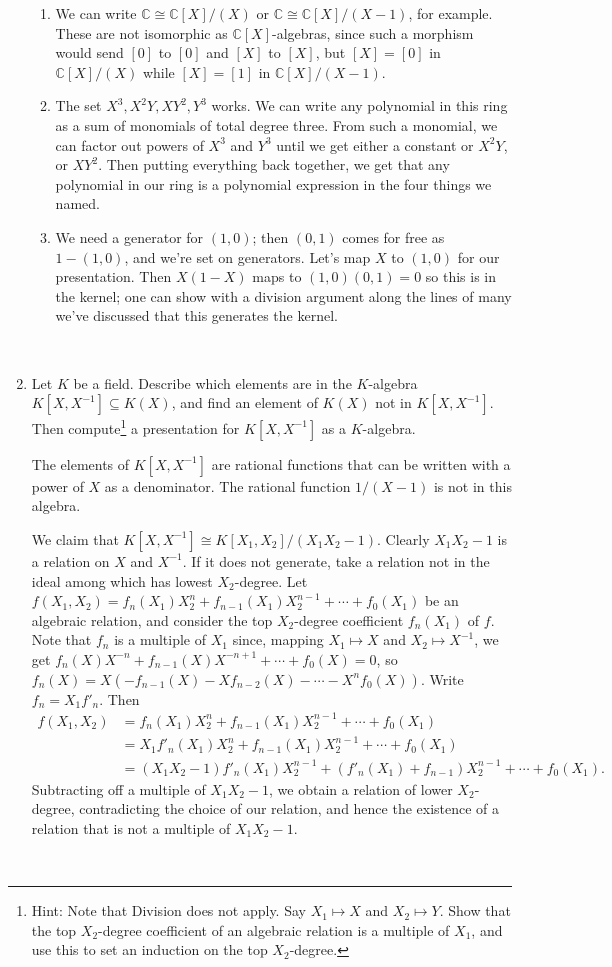 \documentclass[12pt]{amsart}
\newcommand{\C}{\mathbb{C}}
\newcommand{\solution}[1]{\ifthenelse {\equal{\displaysol}{1}} {\begin{framed}{\color{meretale}\noindent #1}\end{framed}} { \ }}
\newcommand\itemB{\stepcounter{enumi}\item[(\theenumi)]}
\newcommand\itemb{\stepcounter{enumii}\item[(\theenumii)]}
\begin{document}
\begin{enumerate}
\solution{
\begin{enumerate}
\itemb We can write $\C\cong \C[X]/(X)$ or $\C \cong \C[X]/(X-1)$, for example. These are not isomorphic as $\C[X]$-algebras, since such a morphism would send $[0]$ to $[0]$ and $[X]$ to $[X]$, but $[X]=[0]$ in $\C[X]/(X)$ while $[X]=[1]$ in $\C[X]/(X-1)$.
\itemb The set $X^3,X^2Y,XY^2,Y^3$ works. We can write any polynomial in this ring as a sum of monomials of total degree three. From such a monomial, we can factor out powers of $X^3$ and $Y^3$ until we get either a constant or $X^2Y$, or $XY^2$. Then putting everything back together, we get that any polynomial in our ring is a polynomial expression in the four things we named.
\itemb We need a generator for $(1,0)$; then $(0,1)$ comes for free as $1-(1,0)$, and we're set on generators. Let's map $X$ to $(1,0)$ for our presentation. Then $X(1-X)$ maps to $(1,0)(0,1)=0$ so this is in the kernel; one can show with a division argument along the lines of many we've discussed that this generates the kernel.
\end{enumerate}
}


\itemB Let $K$ be a field. Describe which elements are in the $K$-algebra $K[X,X^{-1}]\subseteq K(X)$, and find an element of $K(X)$ not in $K[X,X^{-1}]$. Then compute\footnote{Hint: Note that Division does not apply. Say $X_1 \mapsto X$ and $X_2 \mapsto Y$. Show that the top $X_2$-degree coefficient of an algebraic relation is a multiple of $X_1$, and use this to set an induction on the top $X_2$-degree.} a presentation for $K[X,X^{-1}]$ as a $K$-algebra.

\solution{The elements of $K[X,X^{-1}]$ are rational functions that can be written with a power of $X$ as a denominator. The rational function $1/(X-1)$ is not in this algebra.

We claim that $K[X,X^{-1}]\cong K[X_1,X_2]/(X_1 X_2-1)$. Clearly $X_1 X_2-1$ is a relation on $X$ and $X^{-1}$. If it does not generate, take a relation not in the ideal among which has lowest $X_2$-degree. Let $f(X_1,X_2)= f_n(X_1) X_2^n + f_{n-1}(X_1) X_2^{n-1} + \cdots + f_0(X_1)$ be an algebraic relation, and consider the top $X_2$-degree coefficient $f_n(X_1)$ of $f$. Note that $f_n$ is a multiple of $X_1$ since, mapping $X_1\mapsto X$ and $X_2\mapsto X^{-1}$, we get $f_n(X) X^{-n} + f_{n-1}(X) X^{-n+1} + \cdots +f_0(X)=0$, so $f_n(X) = X(-f_{n-1}(X) - X f_{n-2}(X) - \cdots - X^n f_0(X))$. Write $f_n = X_1 f'_n$. Then 
\[ \begin{aligned}
f(X_1,X_2)&= f_n(X_1) X_2^n + f_{n-1}(X_1) X_2^{n-1} + \cdots + f_0(X_1) \\
&= X_1 f'_n(X_1) X_2^n + f_{n-1}(X_1) X_2^{n-1} + \cdots + f_0(X_1) \\ 
&= (X_1 X_2 - 1) f'_n(X_1) X_2^{n-1} + (f'_n(X_1) + f_{n-1}) X_2^{n-1} + \cdots + f_0(X_1).
\end{aligned}\]
Subtracting off a multiple of $X_1 X_2 - 1$, we obtain a relation of lower $X_2$-degree, contradicting the choice of our relation, and hence the existence of a relation that is not a multiple of $X_1 X_2 - 1$.
}




\end{enumerate}
\end{document}
